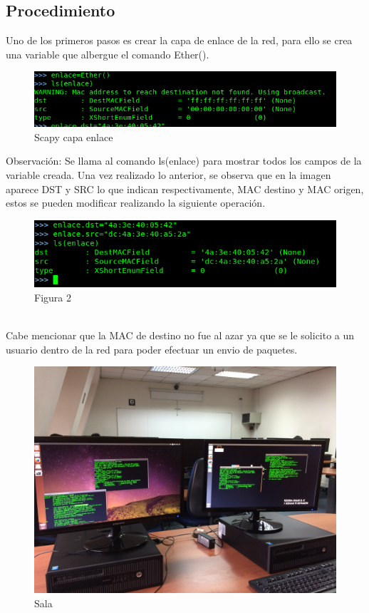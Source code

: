 \documentclass[spanish]{udpreport}
\begin{document}
\subsection{Procedimiento}
Uno de los primeros pasos es crear la capa de enlace de la red, para ello se crea una variable que albergue el comando Ether().
\begin{figure}[h]
    \centering
    \includegraphics[scale=0.3]{images/enlace.png}
    \caption{Scapy capa enlace}
    \label{fig:my_label}
\end{figure}
\newpage
Observación: Se llama al comando ls(enlace) para mostrar todos los campos de la variable creada. Una vez realizado lo anterior, se observa que en la imagen aparece DST y SRC lo que indican respectivamente, MAC destino y MAC origen, estos se pueden modificar realizando la siguiente operación.
\begin{figure}[h]
    \centering
    \includegraphics[scale=0.3]{images/1.png}
    \caption{Figura 2}
    \label{fig:my_label}
\end{figure}
\\Cabe mencionar que la MAC de destino no fue al azar ya que se le solicito a un usuario dentro de la red para poder efectuar un envio de paquetes.
\begin{figure}[h]
    \centering
    \includegraphics[scale=0.1]{images/2.JPG}
    \caption{Sala}
    \label{fig:my_label}
\end{figure}
\end{document}
